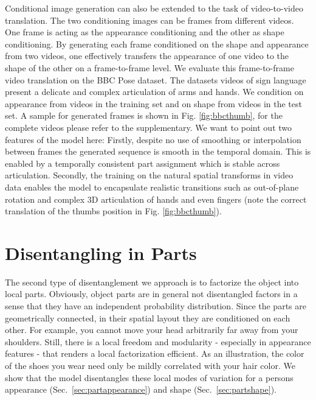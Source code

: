 	Conditional image generation can also be extended to the task of {video-to-video translation}. The two conditioning images can be frames from different videos. One frame is acting as the appearance conditioning and the other as shape conditioning. By generating each frame conditioned on the shape and appearance from two videos, one effectively transfers the appearance of one video to the shape of the other on a frame-to-frame level.
	We evaluate this frame-to-frame video translation on the BBC Pose dataset. The datasets videos of sign language present a delicate and complex articulation of arms and hands. We condition on appearance from videos in the training set and on shape from videos in the test set. A sample for generated frames is shown in Fig. \ref{fig:bbcthumb}, for the complete videos please refer to the supplementary.
	We want to point out two features of the model here: Firstly, despite no use of smoothing or interpolation between frames the generated sequence is smooth in the temporal domain. This is enabled by a temporally consistent part assignment which is stable across articulation.
	Secondly, the training on the natural spatial transforms in video data enables the model to encapsulate realistic transitions such as out-of-plane rotation and complex 3D articulation of \eg hands and even fingers (note the correct translation of the thumbs position in Fig. \ref{fig:bbcthumb}). \\

\section{Disentangling in Parts}\label{sec:partwise}
	The second type of disentanglement we approach is to factorize the object into local parts. Obviously, object parts are in general not disentangled factors in a sense that they have an independent probability distribution. Since the parts are geometrically connected, in their spatial layout they are conditioned on each other. For example, you cannot move your head arbitrarily far away from your shoulders. Still, there is a local freedom and modularity - especially in appearance features - that renders a local factorization efficient. As an illustration, the color of the shoes you wear need only be mildly correlated with your hair color.
	We show that the model disentangles these local modes of variation for a persons appearance (Sec.~\ref{sec:partappearance}) and shape (Sec.~\ref{sec:partshape}).

